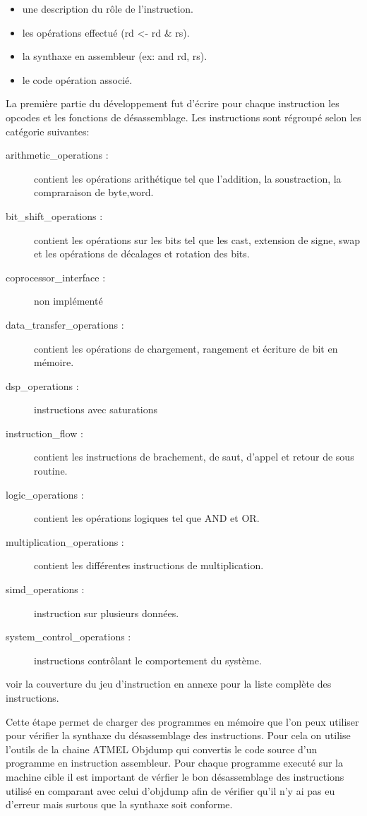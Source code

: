\begin{itemize}
\item une description du rôle de l'instruction.
\item les opérations effectué (rd <- rd \& rs).
\item la synthaxe en assembleur (ex: and rd, rs).
\item le code opération associé.
\end{itemize}

La première partie du développement fut d'écrire pour chaque instruction les opcodes et les fonctions de désassemblage.
Les instructions sont régroupé selon les catégorie suivantes:

\begin{description}
\item[arithmetic\_operations :] contient les opérations arithétique tel que l'addition, la soustraction, la compraraison de byte,word.
\item[bit\_shift\_operations :] contient les opérations sur les bits tel que les cast, extension de signe, swap et les opérations de décalages et rotation des bits.
\item[coprocessor\_interface :] non implémenté
\item[data\_transfer\_operations :] contient les opérations de chargement, rangement et écriture de bit en mémoire.
\item[dsp\_operations :] instructions avec saturations
\item[instruction\_flow :] contient les instructions de brachement, de saut, d'appel et retour de sous routine.
\item[logic\_operations :] contient les opérations logiques tel que AND et OR. 
\item[multiplication\_operations :] contient les différentes instructions de multiplication.
\item[simd\_operations :] instruction sur plusieurs données. 
\item[system\_control\_operations :] instructions contrôlant le comportement du système.
\end{description}

voir la couverture du jeu d'instruction en annexe pour la liste complète des instructions.

Cette étape permet de charger des programmes en mémoire que l'on peux utiliser pour vérifier la synthaxe du désassemblage des instructions. 
Pour cela on utilise l'outils de la chaine ATMEL Objdump qui convertis le code source d'un programme en instruction assembleur. 
Pour chaque programme executé sur la machine cible il est important de vérfier le bon désassemblage des instructions utilisé en comparant avec celui d'objdump
afin de vérifier qu'il n'y ai pas eu d'erreur mais surtous que la synthaxe soit conforme.

